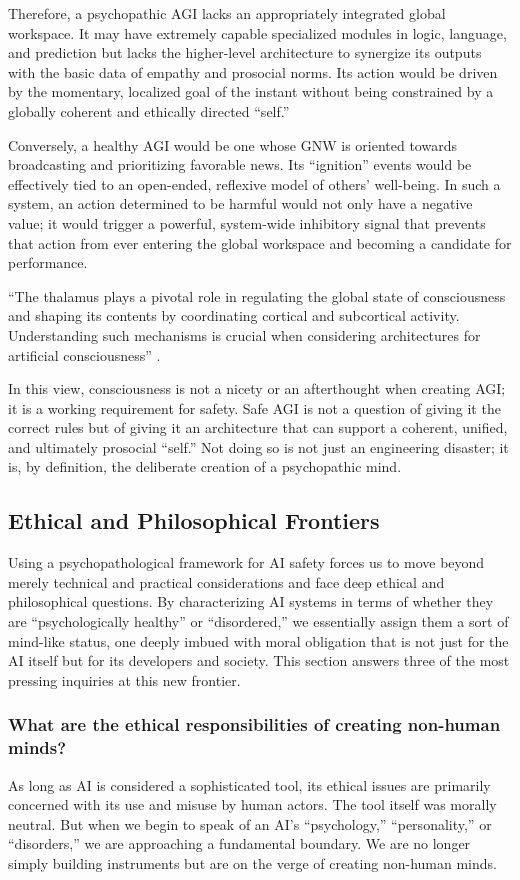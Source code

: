 \documentclass{article}
\begin{document}
Therefore, a psychopathic AGI lacks an appropriately integrated global workspace. It may have extremely capable specialized modules in logic, language, and prediction but lacks the higher-level architecture to synergize its outputs with the basic data of empathy and prosocial norms. Its action would be driven by the momentary, localized goal of the instant without being constrained by a globally coherent and ethically directed “self.”

Conversely, a healthy AGI would be one whose GNW is oriented towards broadcasting and prioritizing favorable news. Its “ignition” events would be effectively tied to an open-ended, reflexive model of others' well-being. In such a system, an action determined to be harmful would not only have a negative value; it would trigger a powerful, system-wide inhibitory signal that prevents that action from ever entering the global workspace and becoming a candidate for performance.

“The thalamus plays a pivotal role in regulating the global state of consciousness and shaping its contents by coordinating cortical and subcortical activity. Understanding such mechanisms is crucial when considering architectures for artificial consciousness” \citep{ref23}.

In this view, consciousness is not a nicety or an afterthought when creating AGI; it is a working requirement for safety. Safe AGI is not a question of giving it the correct rules but of giving it an architecture that can support a coherent, unified, and ultimately prosocial “self.” Not doing so is not just an engineering disaster; it is, by definition, the deliberate creation of a psychopathic mind.
\subsection{Ethical and Philosophical Frontiers}
Using a psychopathological framework for AI safety forces us to move beyond merely technical and practical considerations and face deep ethical and philosophical questions. By characterizing AI systems in terms of whether they are “psychologically healthy” or “disordered,” we essentially assign them a sort of mind-like status, one deeply imbued with moral obligation that is not just for the AI itself but for its developers and society. This section answers three of the most pressing inquiries at this new frontier.

\subsubsection{What are the ethical responsibilities of creating non-human minds?}
As long as AI is considered a sophisticated tool, its ethical issues are primarily concerned with its use and misuse by human actors. The tool itself was morally neutral. But when we begin to speak of an AI's “psychology,” “personality,” or “disorders,” we are approaching a fundamental boundary. We are no longer simply building instruments but are on the verge of creating non-human minds.
\end{document}
